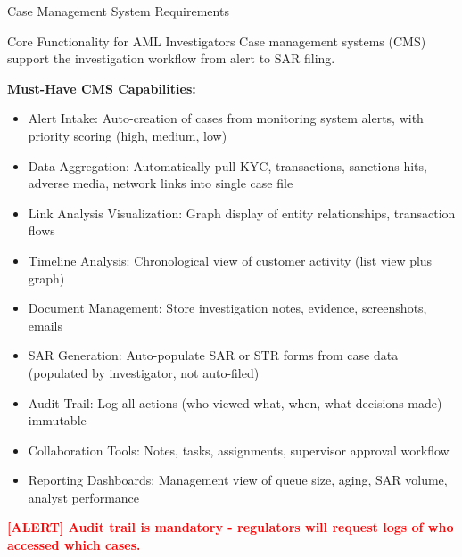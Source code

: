 \documentclass[11pt,a4paper]{beamer}
\newcommand{\redflag}[1]{\textcolor{red}{\textbf{[ALERT] #1}}}
\begin{document}
	\begin{frame}{Case Management System Requirements}
		\begin{block}{Core Functionality for AML Investigators}
			Case management systems (CMS) support the investigation workflow from alert to SAR filing.
		\end{block}
		
		\textbf{Must-Have CMS Capabilities:}
		\begin{itemize}
			\item Alert Intake: Auto-creation of cases from monitoring system alerts, with priority scoring (high, medium, low)
			\item Data Aggregation: Automatically pull KYC, transactions, sanctions hits, adverse media, network links into single case file
			\item Link Analysis Visualization: Graph display of entity relationships, transaction flows
			\item Timeline Analysis: Chronological view of customer activity (list view plus graph)
			\item Document Management: Store investigation notes, evidence, screenshots, emails
			\item SAR Generation: Auto-populate SAR or STR forms from case data (populated by investigator, not auto-filed)
			\item Audit Trail: Log all actions (who viewed what, when, what decisions made) - immutable
			\item Collaboration Tools: Notes, tasks, assignments, supervisor approval workflow
			\item Reporting Dashboards: Management view of queue size, aging, SAR volume, analyst performance
		\end{itemize}
		
		\redflag{Audit trail is mandatory - regulators will request logs of who accessed which cases.}
	\end{frame}
	
\end{document}
